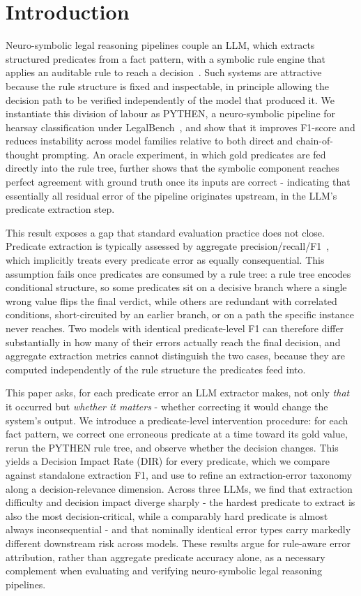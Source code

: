 \section{Introduction}
\label{sec:intro}

Neuro-symbolic legal reasoning pipelines couple an LLM, which extracts structured predicates from a fact pattern, with a symbolic rule engine that applies an auditable rule to reach a decision~\cite{yang2025neuro}. Such systems are attractive because the rule structure is fixed and inspectable, in principle allowing the decision path to be verified independently of the model that produced it. We instantiate this division of labour as PYTHEN, a neuro-symbolic pipeline for hearsay classification under LegalBench~\cite{guha2023legalbench}, and show that it improves F1-score and reduces instability across model families relative to both direct and chain-of-thought prompting. An oracle experiment, in which gold predicates are fed directly into the rule tree, further shows that the symbolic component reaches perfect agreement with ground truth once its inputs are correct - indicating that essentially all residual error of the pipeline originates upstream, in the LLM's predicate extraction step.

This result exposes a gap that standard evaluation practice does not close. Predicate extraction is typically assessed by aggregate precision/recall/F1~\cite{olek2023evaluationf1scorerecent}, which implicitly treats every predicate error as equally consequential. This assumption fails once predicates are consumed by a rule tree: a rule tree encodes conditional structure, so some predicates sit on a decisive branch where a single wrong value flips the final verdict, while others are redundant with correlated conditions, short-circuited by an earlier branch, or on a path the specific instance never reaches. Two models with identical predicate-level F1 can therefore differ substantially in how many of their errors actually reach the final decision, and aggregate extraction metrics cannot distinguish the two cases, because they are computed independently of the rule structure the predicates feed into.

This paper asks, for each predicate error an LLM extractor makes, not only \emph{that} it occurred but \emph{whether it matters} - whether correcting it would change the system's output. We introduce a predicate-level intervention procedure: for each fact pattern, we correct one erroneous predicate at a time toward its gold value, rerun the PYTHEN rule tree, and observe whether the decision changes. This yields a Decision Impact Rate (DIR) for every predicate, which we compare against standalone extraction F1, and use to refine an extraction-error taxonomy along a decision-relevance dimension. Across three LLMs, we find that extraction difficulty and decision impact diverge sharply - the hardest predicate to extract is also the most decision-critical, while a comparably hard predicate is almost always inconsequential - and that nominally identical error types carry markedly different downstream risk across models. These results argue for rule-aware error attribution, rather than aggregate predicate accuracy alone, as a necessary complement when evaluating and verifying neuro-symbolic legal reasoning pipelines.
